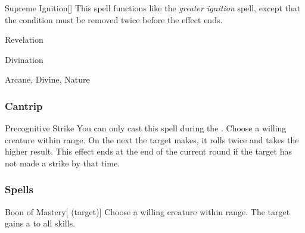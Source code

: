 \lowercase{\hypertarget{spell:Supreme Ignition}{}}\label{spell:Supreme Ignition}
\begin{apability}[\nth{6}]{\hypertarget{spell:Supreme Ignition}{Supreme Ignition}}[]
This spell functions like the \textit{greater ignition} spell, except that the condition must be removed twice before the effect ends.
\end{apability}
\vspace{0.25em}


\newpage
\begin{spellsection}{Revelation}

\begin{spellheader}
\end{spellheader}


 Divination

 Arcane, Divine, Nature

\subsubsection{Cantrip}


\begin{freeability}{Precognitive Strike}
You can only cast this spell during the .
Choose a willing creature within \rngclose range.
On the next  the target makes, it rolls twice and takes the higher result.
This effect ends at the end of the current round if the target has not made a strike by that time.
\end{freeability}

\end{spellsection}


\subsubsection{Spells}


\lowercase{\hypertarget{spell:Boon of Mastery}{}}\label{spell:Boon of Mastery}
\begin{attuneability}[\nth{1}]{\hypertarget{spell:Boon of Mastery}{Boon of Mastery}}[ (target)]
Choose a willing creature within \rngclose range.
The target gains a   to all skills.
\end{attuneability}
\vspace{0.25em}




